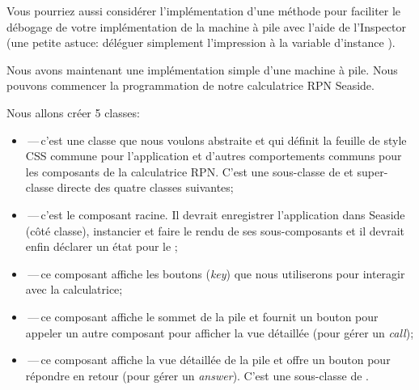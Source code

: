 \documentclass[a4paper,10pt,twoside]{book}
\begin{document}
Vous pourriez aussi considérer l'implémentation d'une méthode
 pour faciliter le débogage de votre
implémentation de la machine à pile avec l'aide de l'Inspector
(une petite astuce: déléguer simplement l'impression  à
la variable d'instance ).


Nous avons maintenant une implémentation simple d'une machine à
pile. Nous pouvons commencer la programmation de notre calculatrice
RPN Seaside.

Nous allons créer 5 classes:
\begin{itemize}
  \item {}\,---\,c'est une classe que nous voulons
    abstraite et qui définit la feuille de style CSS commune pour
    l'application et d'autres comportements communs pour les
    composants de la calculatrice RPN.
C'est une sous-classe de  et super-classe directe des
quatre classes suivantes;
  
    \item {}\,---\,c'est le composant racine.
      Il devrait enregistrer l'application dans Seaside (côté classe),
      instancier et faire le rendu de ses sous-composants et il
      devrait enfin déclarer un état pour le \backtracking;
  \item {}\,---\,ce composant affiche les boutons
    (\emph{key}) que nous utiliserons pour interagir avec la
    calculatrice;
  \item {}\,---\,ce composant affiche le sommet de la pile
    et fournit un bouton pour appeler un autre composant pour afficher
    la vue détaillée
(\ie pour gérer un \emph{call});
  \item {}\,---\,ce composant affiche la vue
    détaillée de la pile et offre un bouton pour répondre en retour
(\ie pour gérer un \emph{answer}).
C'est une sous-classe de .
\end{itemize}

\end{document}

